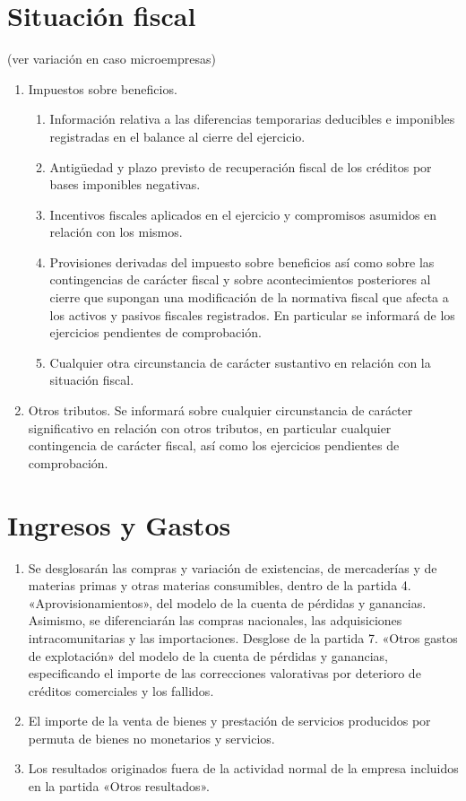 \documentclass[11pt,a4paper]{article}
\begin{document}
\section{Situación fiscal}
(ver variación en caso microempresas)
\begin{enumerate}
 \item Impuestos sobre beneficios.
  \begin{enumerate}
   \item Información relativa a las diferencias temporarias deducibles e imponibles registradas en el balance al cierre del ejercicio.

   \item Antigüedad y plazo previsto de recuperación fiscal de los créditos por bases imponibles negativas.

   \item Incentivos fiscales aplicados en el ejercicio y compromisos asumidos en relación con los mismos.

   \item Provisiones derivadas del impuesto sobre beneficios así como sobre las contingencias de carácter fiscal y sobre acontecimientos posteriores al cierre que supongan una modificación de la normativa fiscal que afecta a los activos y pasivos fiscales registrados. En particular se informará de los ejercicios pendientes de comprobación.

   \item Cualquier otra circunstancia de carácter sustantivo en relación con la situación fiscal.
  \end{enumerate}

\item Otros tributos.
Se informará sobre cualquier circunstancia de carácter significativo en relación con otros tributos, en particular cualquier contingencia de carácter fiscal, así como los ejercicios pendientes de comprobación.
\end{enumerate}


\section{Ingresos y Gastos}
\begin{enumerate}
 \item Se desglosarán las compras y variación de existencias, de mercaderías y de materias primas y otras materias consumibles, dentro de la partida 4. «Aprovisionamientos», del modelo de la cuenta de pérdidas y ganancias. Asimismo, se diferenciarán las compras nacionales, las adquisiciones intracomunitarias y las importaciones.
 Desglose de la partida 7. «Otros gastos de explotación» del modelo de la cuenta de pérdidas y ganancias, especificando el importe de las correcciones valorativas por deterioro de créditos comerciales y los fallidos.

\item El importe de la venta de bienes y prestación de servicios producidos por permuta de bienes no monetarios y servicios.

\item Los resultados originados fuera de la actividad normal de la empresa incluidos en la partida «Otros resultados».
\end{enumerate}
\end{document}
